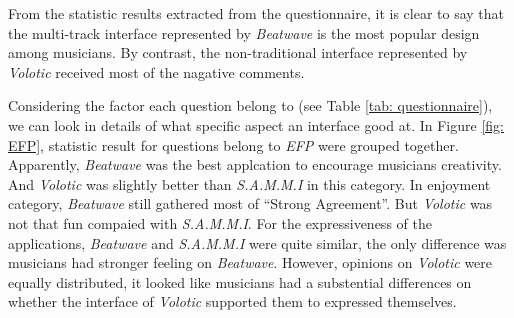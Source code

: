 From the statistic results extracted from the questionnaire, it is clear to say that the multi-track interface represented by \textit{Beatwave} is the most popular design among musicians. By contrast, the non-traditional interface represented by \textit{Volotic} received most of the nagative comments.

Considering the factor each question belong to (see Table \ref{tab: questionnaire}), we can look in details of what specific aspect an interface good at. In Figure \ref{fig: EFP}, statistic result for questions belong to \textit{EFP} were grouped together. Apparently, \textit{Beatwave} was the best applcation to encourage musicians creativity. And \textit{Volotic} was slightly better than \textit{S.A.M.M.I} in this category. In enjoyment category, \textit{Beatwave} still gathered most of \textquotedblleft{Strong Agreement}\textquotedblright. But \textit{Volotic} was not that fun compaied with \textit{S.A.M.M.I}. For the expressiveness of the applications, \textit{Beatwave} and \textit{S.A.M.M.I} were quite similar, the only difference was musicians had stronger feeling on \textit{Beatwave}. However, opinions on \textit{Volotic} were equally distributed, it looked like musicians had a substential differences on whether the interface of \textit{Volotic} supported them to expressed themselves.
%
%
%
%


\clearpage
